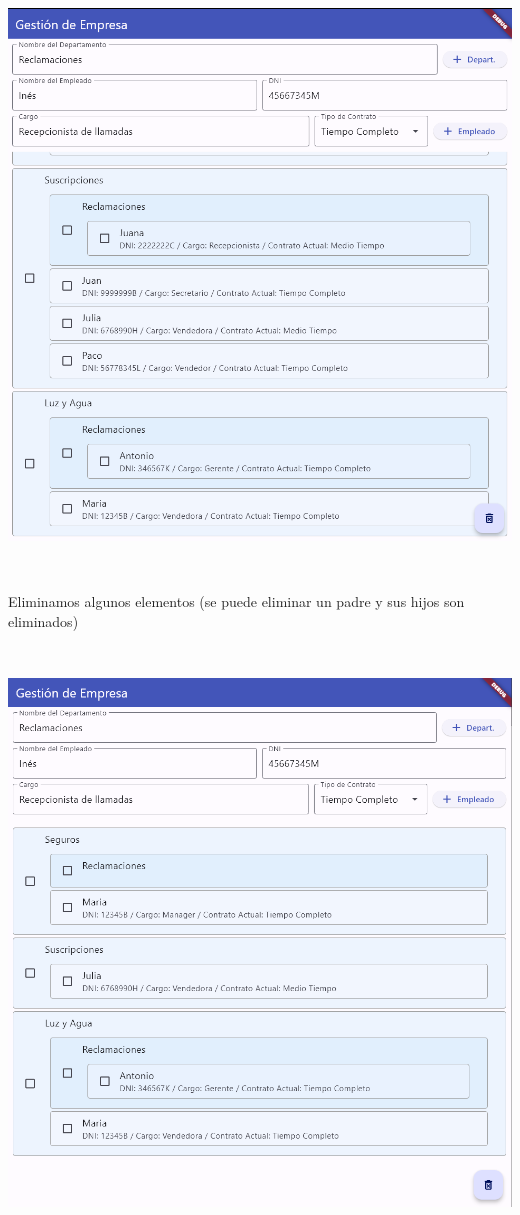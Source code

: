 \documentclass[
]{article}
\begin{document}
\includegraphics[width=5.90522in,height=6.23611in]{imagenes/Funcionamiento2.png}

Eliminamos algunos elementos (se puede eliminar un padre y sus hijos son
eliminados)

\includegraphics[width=5.90522in,height=6.19444in]{imagenes/Funcionamiento3.png}
\end{document}
